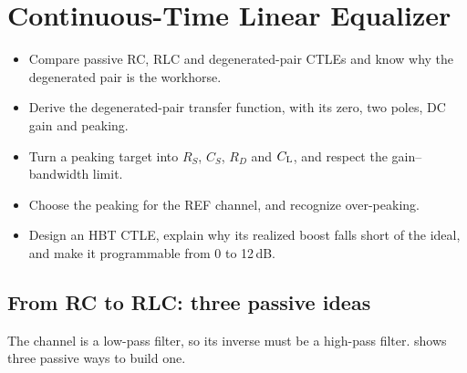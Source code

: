 \chapter{Continuous-Time Linear Equalizer}\label{ch:ctle}
\suppressfloats[t]

\begin{objectives}
\begin{itemize}
  \item Compare passive RC, RLC and degenerated-pair CTLEs and know why the degenerated pair is the workhorse.
  \item Derive the degenerated-pair transfer function, with its zero, two poles, DC gain and peaking.
  \item Turn a peaking target into $R_S$, $C_S$, $R_D$ and $C_\mathrm{L}$, and respect the gain--bandwidth limit.
  \item Choose the peaking for the REF channel, and recognize over-peaking.
  \item Design an \sgx{} HBT CTLE, explain why its realized boost falls short of the ideal, and make it programmable from 0 to 12\,dB.
\end{itemize}
\end{objectives}

\section{From RC to RLC: three passive ideas}\label{sec:ch7-passive}

The channel is a low-pass filter, so its inverse must be a high-pass filter.  shows three passive ways to build one.

